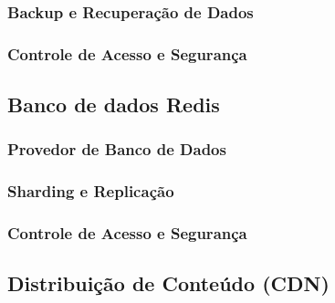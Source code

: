 

\subsubsection{Backup e Recuperação de Dados}

\subsubsection{Controle de Acesso e Segurança}

\subsection{Banco de dados Redis}

\subsubsection{Provedor de Banco de Dados}

\subsubsection{Sharding e Replicação}

\subsubsection{Controle de Acesso e Segurança}



\subsection{Distribuição de Conteúdo (CDN)}

